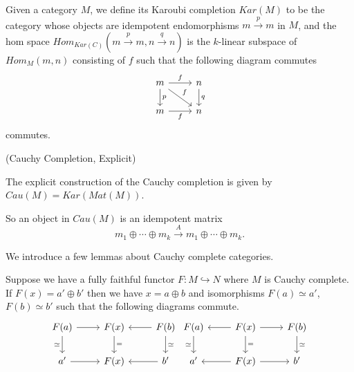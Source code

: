\begin{definition}
  Given a category $M$, we define its Karoubi completion $Kar(M)$ to be the category whose objects are idempotent endomorphisms $m \xrightarrow{p} m$ in $M$, and the hom space $Hom_{Kar(C)}(m \xrightarrow{p} m, n \xrightarrow{q} n)$ is the $k$-linear subspace of $Hom_{M}(m,n)$ consisting of $f$ such that the following diagram commutes
  \[\begin{tikzcd}
	m & n \\
	m & n
	\arrow["f", from=1-1, to=1-2]
	\arrow["p", from=1-1, to=2-1]
	\arrow["f", from=1-1, to=2-2]
	\arrow["q", from=1-2, to=2-2]
	\arrow["f"', from=2-1, to=2-2]
\end{tikzcd}\] commutes.\end{definition}

\begin{definition} \label{definition/cauchy-completion/explicit} (Cauchy Completion, Explicit)

  The explicit construction of the Cauchy completion is given by $Cau(M)=Kar(Mat(M))$. \end{definition}

\noindent So an object in $Cau(M)$ is an idempotent matrix $$m_1\oplus\cdots\oplus m_k \xrightarrow{A} m_1\oplus\cdots\oplus m_k.$$

\noindent We introduce a few lemmas about Cauchy complete categories.

\begin{lemma}\label{direct_sum}
  Suppose we have a fully faithful functor $F:M\hookrightarrow N$ where $M$ is
  Cauchy complete. If $F(x)=a'\oplus b'$ then we have $x=a\oplus b$ and
  isomorphisms $F(a)\simeq a'$, $F(b)\simeq b'$ such that the following
  diagrams commute.
  \[
    \begin{tikzcd}
      {F(a)} & {F(x)} & {F(b)} \\
      {a'} & {F(x)} & {b'}
      \arrow[from=1-1, to=1-2]
      \arrow["\simeq"', from=1-1, to=2-1]
      \arrow["{=}", from=1-2, to=2-2]
      \arrow[from=1-3, to=1-2]
      \arrow["\simeq", from=1-3, to=2-3]
      \arrow[from=2-1, to=2-2]
      \arrow[from=2-3, to=2-2]
    \end{tikzcd} \begin{tikzcd}
      {F(a)} & {F(x)} & {F(b)} \\
      {a'} & {F(x)} & {b'}
      \arrow["\simeq"', from=1-1, to=2-1]
      \arrow[from=1-2, to=1-1]
      \arrow[from=1-2, to=1-3]
      \arrow["{=}", from=1-2, to=2-2]
      \arrow["\simeq", from=1-3, to=2-3]
      \arrow[from=2-2, to=2-1]
      \arrow[from=2-2, to=2-3]
    \end{tikzcd}
  \]
\end{lemma}

